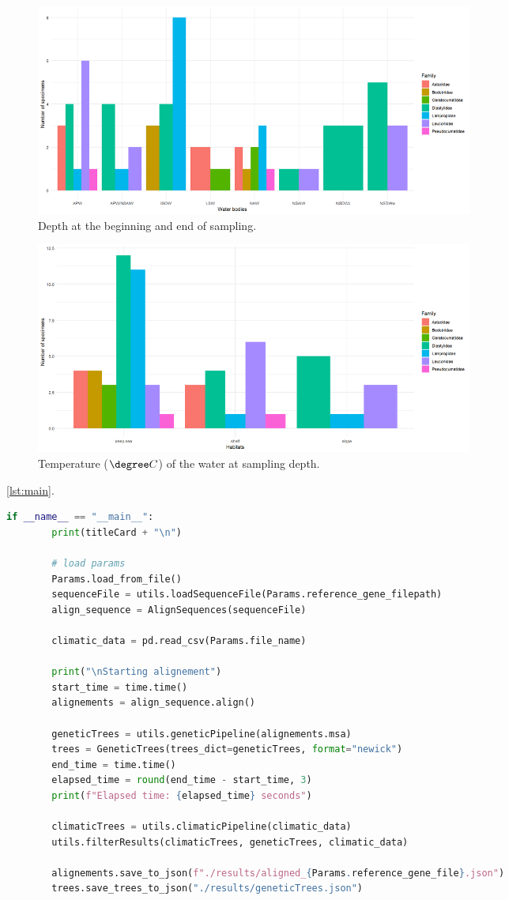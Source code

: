 \begin{figure}[]
    \centering
    \includegraphics[width=0.7\textwidth]{figure3.png}
    \caption{Depth at the beginning and end of sampling. \label{fig:fig3}}
\end{figure}

\begin{figure}[]
    \centering
    \includegraphics[width=0.7\textwidth]{figure4.png}
    \caption{Temperature (\( \degree C \)) of the water at sampling depth. \label{fig:fig4}}
\end{figure}

\autoref{lst:main}.
\begin{lstlisting}[label=lst:main,language=Python,caption=aPhyloGeo’s main function]
    if __name__ == "__main__":
        print(titleCard + "\n")

        # load params 
        Params.load_from_file()
        sequenceFile = utils.loadSequenceFile(Params.reference_gene_filepath)
        align_sequence = AlignSequences(sequenceFile)

        climatic_data = pd.read_csv(Params.file_name)

        print("\nStarting alignement")
        start_time = time.time()
        alignements = align_sequence.align()

        geneticTrees = utils.geneticPipeline(alignements.msa)
        trees = GeneticTrees(trees_dict=geneticTrees, format="newick")
        end_time = time.time()
        elapsed_time = round(end_time - start_time, 3)
        print(f"Elapsed time: {elapsed_time} seconds")

        climaticTrees = utils.climaticPipeline(climatic_data)
        utils.filterResults(climaticTrees, geneticTrees, climatic_data)

        alignements.save_to_json(f"./results/aligned_{Params.reference_gene_file}.json")
        trees.save_trees_to_json("./results/geneticTrees.json")
\end{lstlisting}

